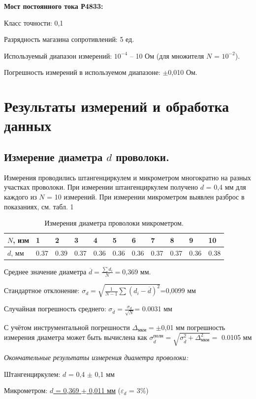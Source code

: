 \documentclass[12pt,a4paper]{article}
\begin{document}
{\bfseries Мост постоянного тока Р4833:}

\quad Класс точности: 0,1

\quad Разрядность магазина сопротивлений: 5 ед.

\quad Используемый диапазон измерений: $10^{-4}$ – 10 Ом (для множителя $N$ = $10^{-2}$).

\quad Погрешность измерений в используемом диапазоне: $\pm$0,010 Ом.

\section{ Результаты измерений и обработка данных}
\subsection{Измерение диаметра $d$ проволоки.}
Измерения проводились штангенциркулем и микрометром многократно на разных участках
проволоки. При измерении штангенциркулем получено $d$ = 0,4 мм для каждого из $N$ = 10
измерений. При измерении микрометром выявлен разброс в показаниях, см. табл. 1
\begin{table}[!ht]
    \label{tbl:d}
     \caption{\newline Измерения диаметра проволоки микрометром.
    }
    \centering
    \begin{tabular}{|l|l|l|l|l|l|l|l|l|l|l|}
    \hline
        $N$, изм & 1 & 2 & 3 & 4 & 5 & 6 & 7 & 8 & 9 & 10 \\ \hline
        $d$, мм & 0.37 & 0.39 & 0.37 & 0.36 & 0.36 & 0.36 & 0.37 & 0.37 & 0.36 & 0.38 \\ \hline
    \end{tabular}
\end{table}

Среднее значение диаметра $\overline{d}=\frac{\sum d_i}{N}=$0,369 мм.

Стандартное отклонение: $\sigma{_d} = \sqrt{\frac{1}{N-1}\sum (d_i-\overline{d})^{2}}$=0,0099 мм

Случайная погрешность среднего: $\sigma _{\overline{d}} = \frac{\sigma _d}{\sqrt{N}}$= 0.0031 мм

С учётом инструментальной погрешности $\Delta _{мкм} = \pm$0,01 мм погрешность измерения диаметра может быть вычислена как $\sigma ^{полн} _{\overline{d}} = \sqrt{ \sigma ^{2} _{\overline{d}} + \Delta ^2 _{мкм}} = $ 0.0105 мм

\textit{Окончательные результаты измерения диаметра проволоки:}
\begin{center}
{ Штангенциркулем: $d$ = 0,4 $\pm$ 0,1 мм}

{ Микрометром: \underline{$d$ = 0,369 $\pm$ 0,011 мм} ($\varepsilon _d$ = 3\%)}
\end{center}
\end{document}
